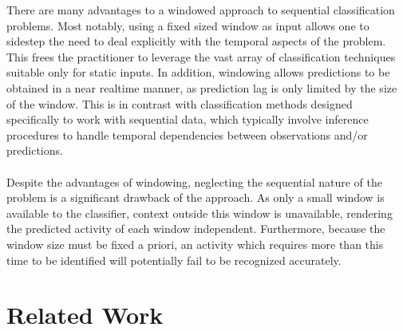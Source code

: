 \documentclass[12pt]{report}
\newcommand{\1}[0]{\mathbbm{1}}
\begin{document}
There are many advantages to a windowed approach to sequential classification problems.
Most notably, using a fixed sized window as input allows one to sidestep the need to deal
explicitly with the temporal aspects of the problem. This frees the practitioner
to leverage the vast array of classification techniques suitable only for static
inputs. In addition, windowing allows predictions to be obtained in
a near realtime manner, as prediction lag is only limited by the size
of the window. This is in contrast with classification methods designed specifically
to work with sequential data, which typically involve inference procedures
to handle temporal dependencies between observations and/or predictions.
\\\\
Despite the advantages of windowing, neglecting the sequential nature of the problem
is a significant drawback of the approach. As only a small window is available
to the classifier, context outside this window is unavailable, rendering
the predicted activity of each window independent. Furthermore, because the
window size must be fixed a priori, an activity which requires more than this time
to be identified will potentially fail to be recognized accurately.

\section{Related Work}
\label{sec:HAR Related Work}
\end{document}
